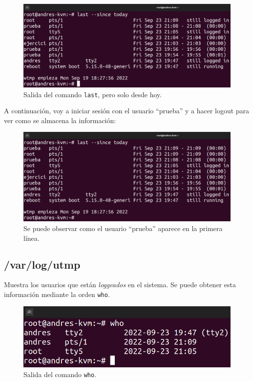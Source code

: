 \documentclass{article}
\begin{document}
\begin{figure}[H]
    \includegraphics[width=\textwidth]{imagenes/lasttoday.png}
    \caption{Salida del comando \texttt{last}, pero solo desde hoy.}
\end{figure}


A continuación, voy a iniciar sesión con el usuario ``prueba'' y a hacer logout para ver como se almacena la información:

\begin{figure}[H]
    \includegraphics[width=\textwidth]{imagenes/lasttodayprueba.png}
    \caption{Se puede observar como el usuario ``prueba'' aparece en la primera línea.}
\end{figure}

\newpage

\subsection{/var/log/utmp}
Muestra los usuarios que están \textit{loggeados} en el sistema. Se puede obtener esta información mediante la orden \verb|who|.

\begin{figure}[H]
    \includegraphics[width=\textwidth]{imagenes/whonormal.png}
    \caption{Salida del comando \texttt{who}.}
\end{figure}
\end{document}
